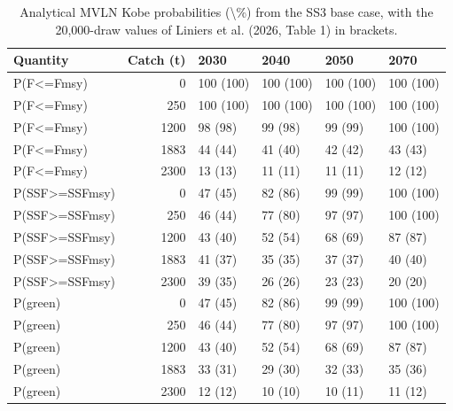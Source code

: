 \begin{table}[H]

\caption{\label{tab:liniers}Analytical MVLN Kobe probabilities (\textbackslash{}\%) from the SS3 base case, with the 20,000-draw values of Liniers et al. (2026, Table 1) in brackets.}
\centering
\begin{tabular}[t]{lrllll}
\toprule
Quantity & Catch (t) & 2030 & 2040 & 2050 & 2070\\
\midrule
P(F<=Fmsy) & 0 & 100 (100) & 100 (100) & 100 (100) & 100 (100)\\
P(F<=Fmsy) & 250 & 100 (100) & 100 (100) & 100 (100) & 100 (100)\\
P(F<=Fmsy) & 1200 & 98 (98) & 99 (98) & 99 (99) & 100 (100)\\
P(F<=Fmsy) & 1883 & 44 (44) & 41 (40) & 42 (42) & 43 (43)\\
P(F<=Fmsy) & 2300 & 13 (13) & 11 (11) & 11 (11) & 12 (12)\\
\addlinespace
P(SSF>=SSFmsy) & 0 & 47 (45) & 82 (86) & 99 (99) & 100 (100)\\
P(SSF>=SSFmsy) & 250 & 46 (44) & 77 (80) & 97 (97) & 100 (100)\\
P(SSF>=SSFmsy) & 1200 & 43 (40) & 52 (54) & 68 (69) & 87 (87)\\
P(SSF>=SSFmsy) & 1883 & 41 (37) & 35 (35) & 37 (37) & 40 (40)\\
P(SSF>=SSFmsy) & 2300 & 39 (35) & 26 (26) & 23 (23) & 20 (20)\\
\addlinespace
P(green) & 0 & 47 (45) & 82 (86) & 99 (99) & 100 (100)\\
P(green) & 250 & 46 (44) & 77 (80) & 97 (97) & 100 (100)\\
P(green) & 1200 & 43 (40) & 52 (54) & 68 (69) & 87 (87)\\
P(green) & 1883 & 33 (31) & 29 (30) & 32 (33) & 35 (36)\\
P(green) & 2300 & 12 (12) & 10 (10) & 10 (11) & 11 (12)\\
\bottomrule
\end{tabular}
\end{table}
